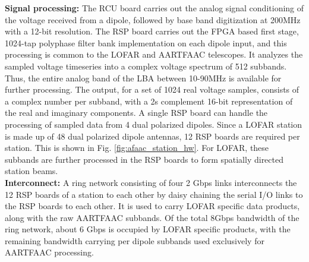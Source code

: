 \documentclass{ws-jai}
\begin{document}
\noindent  \textbf {Signal  processing:} The  RCU board  carries out  the analog
signal conditioning of the voltage received from a dipole, followed by base band
digitization at 200MHz  with a 12-bit resolution. The RSP  board carries out the
FPGA based  first stage, 1024-tap  polyphase filter bank implementation  on each
dipole  input,  and  this  processing  is  common  to  the  LOFAR  and  AARTFAAC
telescopes. It  analyzes the sampled  voltage timeseries into a  complex voltage
spectrum  of 512  subbands. Thus,  the  entire analog  band of  the LBA  between
10-90MHz is available for further processing. The output, for a set of 1024 real
voltage samples, consists of a complex  number per subband, with a 2s complement
16-bit representation of  the real and imaginary components. A  single RSP board
can handle the processing of sampled  data from 4 dual polarized dipoles.  Since
a LOFAR station is  made up of 48 dual polarized dipole  antennas, 12 RSP boards
are required per station.  This is shown in Fig. \ref{fig:afaac_station_hw}. For
LOFAR, these subbands are further processed  in the RSP boards to form spatially
directed station beams.\\



\noindent \textbf {Interconnect:} A ring network consisting of four 2 Gbps links
interconnects the 12 RSP boards of a station to each other by daisy chaining the
serial I/O  links to the  RSP boards to  each other. It  is used to  carry LOFAR
specific data products, along with the raw AARTFAAC subbands. Of the total 8Gbps
bandwidth  of the  ring  network,  about 6 Gbps  is  occupied  by LOFAR  specific
products,  with  the  remaining  bandwidth carrying  per  dipole  subbands  used
exclusively for AARTFAAC processing.\\
\end{document}
